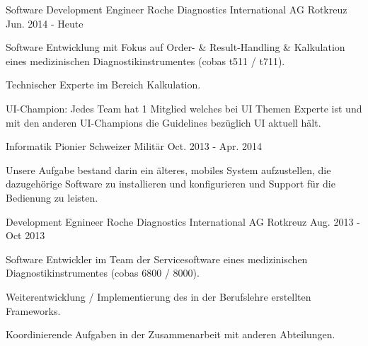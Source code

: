 

\begin{cventries}

  \cventry
    {Software Development Engineer} %
    {Roche Diagnostics International AG} %
    {Rotkreuz} %
    {Jun. 2014 - Heute} %
    {
      \begin{cvitems} %
      	\item {Software Entwicklung mit Fokus auf Order- \& Result-Handling \& Kalkulation eines medizinischen Diagnostikinstrumentes (cobas t511 / t711).}
        \item {Technischer Experte im Bereich Kalkulation.}
        \item {UI-Champion: Jedes Team hat 1 Mitglied welches bei UI Themen Experte ist und mit den anderen UI-Champions die Guidelines bezüglich UI aktuell hält.}
      \end{cvitems}
    }

  \cventry
    {Informatik Pionier} %
    {Schweizer Militär} %
    {} %
    {Oct. 2013 - Apr. 2014} %
    {
      \begin{cvitems} %
        \item {Unsere Aufgabe bestand darin ein älteres, mobiles System aufzustellen, die dazugehörige Software zu installieren und konfigurieren und Support für die Bedienung zu leisten.}
      \end{cvitems}
    }

  \cventry
    {Development Egnineer} %
    {Roche Diagnostics International AG} %
    {Rotkreuz} %
    {Aug. 2013 - Oct 2013} %
    {
      \begin{cvitems} %
        \item {Software Entwickler im Team der Servicesoftware eines medizinischen Diagnostikinstrumentes (cobas 6800 / 8000).}
        \item {Weiterentwicklung / Implementierung des in der Berufslehre erstellten Frameworks.}
        \item {Koordinierende Aufgaben in der Zusammenarbeit mit anderen Abteilungen.}
      \end{cvitems}
    }

\end{cventries}
